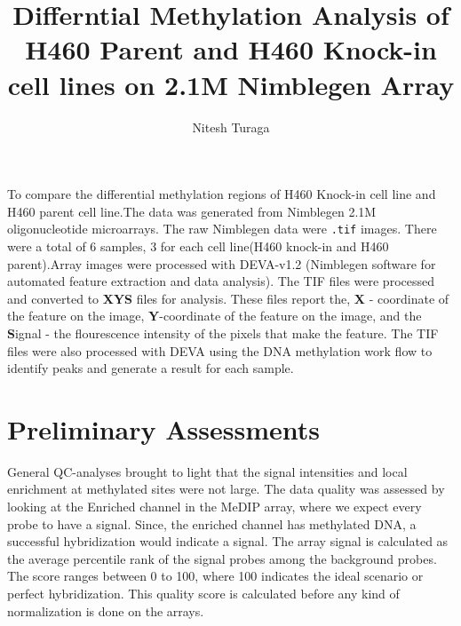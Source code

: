 \documentclass[11pt]{article}
\begin{document}
\newcommand\NAME{Turaga}  %
\newcommand\ANDREWID{nturaga1@jhmi.edu}     %

\title{Differntial Methylation Analysis of H460 Parent and H460 Knock-in cell lines on 2.1M Nimblegen Array}
\author{Nitesh Turaga}
\maketitle



To compare the differential methylation regions of H460 Knock-in cell line and H460 parent cell line.The data was generated from Nimblegen 2.1M oligonucleotide microarrays. The raw Nimblegen data were {\tt .tif} images. There were a total of 6 samples, 3 for each cell line(H460 knock-in and H460 parent).Array images were processed with DEVA-v1.2 (Nimblegen software for automated feature extraction and data analysis). The TIF files were processed and converted to {\bf XYS} files for analysis. These files report the, {\bf X} - coordinate of the feature on the image, {\bf Y}-coordinate of the feature on the image, and the {\bf S}ignal - the flourescence intensity of the pixels that make the feature. The TIF files were also processed with DEVA using the DNA methylation work flow to identify peaks and generate a result for each sample.

\section*{Preliminary Assessments}


General QC-analyses brought to light that the signal intensities and local enrichment at methylated sites were not large. The data quality was assessed by looking at the Enriched channel in the MeDIP array, where we expect every probe to have a signal. Since, the enriched channel has methylated DNA, a successful hybridization would indicate a signal. The array signal is calculated as the average percentile rank of the signal probes among the background probes. The score ranges between 0 to 100, where 100 indicates the ideal scenario or perfect hybridization. This quality score is calculated before any kind of normalization is done on the arrays.
\end{document}

